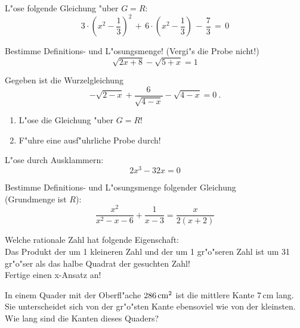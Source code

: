 \documentclass[a4paper, twoside, parskip, 10pt, smallheadings]{scrbook}
\theoremstyle{plain}
\theoremstyle{definition}
\begin{document}
\item
 

L"ose folgende Gleichung "uber $G=R$:
\[  3\cdot \left(x^2-\frac{1}{3}\right)^2\,+\,6 \cdot \left(x^2-\frac{1}{3}
\right)\,-\,\frac{7}{3}\,=\,0\]


\item
 
Bestimme Definitions- und L"osungsmenge! (Vergi"s die Probe nicht!)
$$\sqrt{2x+8} - \sqrt{5+x} = 1$$

\item 
 

Gegeben ist die Wurzelgleichung
\[  -\sqrt{2-x}+\frac{6}{\sqrt{4-x}}-\sqrt{4-x}=0~.\]
\begin{enumerate}
\item	L"ose die Gleichung "uber $G=R$!
\item	F"uhre eine ausf"uhrliche Probe durch!
\end{enumerate}




\item
 
L"ose durch Ausklammern: $$2x^3 - 32x = 0$$


\item
 
Bestimme Definitions- und L"osungsmenge folgender Gleichung\\
(Grundmenge ist $R$):
$$\frac{  x^2}{  x^2 - x - 6} + \frac{  1}{  x - 3} = 
\frac{  x}{  2(x + 2)}$$


\item
 
Welche rationale Zahl hat folgende Eigenschaft:\\
Das Produkt der um 1 kleineren Zahl und der um 1 gr"o"seren Zahl
ist um 31 gr"o"ser als das halbe Quadrat der gesuchten Zahl!\\
Fertige einen x-Ansatz an!

\item
 
In einem Quader mit der Oberfl"ache $286\,{\rm cm}^2$ ist die mittlere Kante
7\,cm lang. Sie unterscheidet sich von der gr"o"sten Kante ebensoviel 
wie von der kleinsten. Wie lang sind die Kanten dieses Quaders?

\item
 
\end{document}
